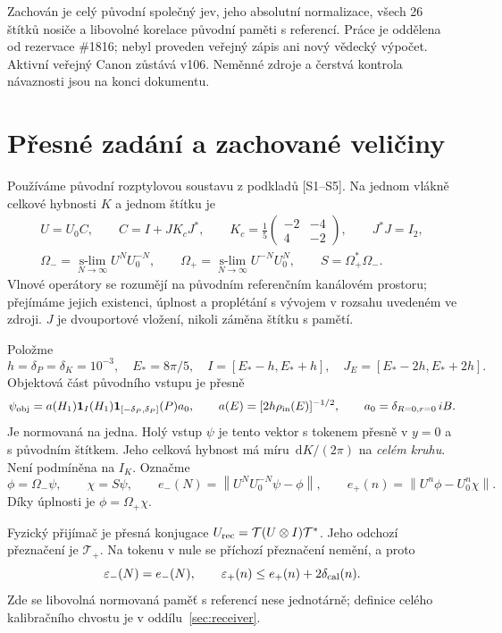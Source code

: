 \documentclass[11pt,a4paper]{article}
\newcommand{\norm}[1]{\left\lVert#1\right\rVert}
\newcommand{\ind}{\mathbf1}
\newcommand{\dd}{\,\mathrm d}
\newcommand{\Tcal}{\mathcal T}
\newcommand{\eps}{\varepsilon}
\theoremstyle{remark}\newtheorem{remark}[theorem]{Poznámka}
\numberwithin{equation}{section}
\begin{document}
\vfill
\small
Zachován je celý původní společný jev, jeho absolutní normalizace, všech 26 štítků nosiče a libovolné korelace původní paměti s referencí. Práce je oddělena od rezervace \#1816; nebyl proveden veřejný zápis ani nový vědecký výpočet. Aktivní veřejný Canon zůstává v106. Neměnné zdroje a čerstvá kontrola návaznosti jsou na konci dokumentu.
\newpage
\normalsize
\section{Přesné zadání a zachované veličiny}

Používáme původní rozptylovou soustavu z podkladů [S1--S5]. Na jednom vlákně celkové hybnosti \(K\) a jednom štítku je
\begin{gather}
U=U_0 C,\qquad C=I+J K_cJ^*,\qquad
K_c=\frac15\begin{pmatrix}-2&-4\\4&-2\end{pmatrix},\qquad J^*J=I_2,\label{eq:law}\\
\Omega_-=\operatorname*{s-lim}_{N\to\infty}U^N U_0^{-N},\qquad
\Omega_+=\operatorname*{s-lim}_{N\to\infty}U^{-N}U_0^N,\qquad
S=\Omega_+^*\Omega_-.
\end{gather}
Vlnové operátory se rozumějí na původním referenčním kanálovém prostoru; přejímáme jejich existenci, úplnost a proplétání s vývojem v rozsahu uvedeném ve zdroji. \(J\) je dvouportové vložení, nikoli záměna štítku s pamětí.

Položme
\[
h=\delta_P=\delta_K=10^{-3},\quad E_*=8\pi/5,\quad
I=[E_*-h,E_*+h],\quad J_E=[E_*-2h,E_*+2h].
\]
Objektová část původního vstupu je přesně
\[
\psi_{\rm obj}=a(H_1)\ind_I(H_1)\ind_{[-\delta_P,\delta_P]}(P)a_0,
\qquad a(E)=[2h\rho_{\rm in}(E)]^{-1/2},\qquad
a_0=\delta_{R=0,r=0}\,iB.
\]
Je normovaná na jedna. Holý vstup \(\psi\) je tento vektor s tokenem přesně v \(y=0\) a s původním štítkem. Jeho celková hybnost má míru \(\dd K/(2\pi)\) na \emph{celém kruhu}. Není podmíněna na \(I_K\). Označme
\[
\phi=\Omega_-\psi,\qquad \chi=S\psi,\qquad
e_-(N)=\norm{U^NU_0^{-N}\psi-\phi},\qquad
e_+(n)=\norm{U^n\phi-U_0^n\chi}.
\]
Díky úplnosti je \(\phi=\Omega_+\chi\).

Fyzický přijímač je přesná konjugace \(U_{\rm rec}=\Tcal(U\otimes I)\Tcal^*\). Jeho odchozí přeznačení je \(\Tcal_+\). Na tokenu v nule se příchozí přeznačení nemění, a proto
\begin{equation}
\eps_-(N)=e_-(N),\qquad
\eps_+(n)\le e_+(n)+2\delta_{\rm cal}(n).
\label{eq:rec-ledger}
\end{equation}
Zde se libovolná normovaná paměť s referencí nese jednotárně; definice celého kalibračního chvostu je v oddílu~\ref{sec:receiver}.
\end{document}
